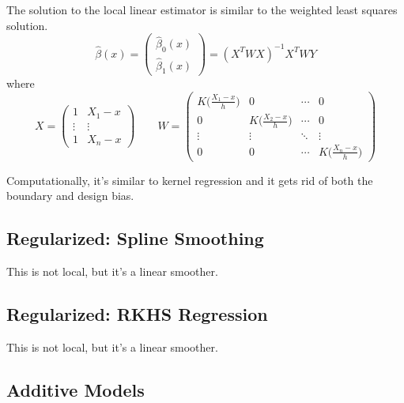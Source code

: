     \begin{theorem}
      The solution to the local linear estimator is similar to the weighted least squares solution. 
      \begin{equation}
        \hat{\beta}(x) = \begin{pmatrix} \hat{\beta}_0 (x) \\ \hat{\beta}_1 (x) \end{pmatrix} = (X^T W X)^{-1} X^T W Y
      \end{equation}
      where 
      \begin{equation}
        X = \begin{pmatrix} 1 & X_1 - x \\ \vdots & \vdots \\ 1 & X_n - x \end{pmatrix} \qquad W = \begin{pmatrix} K \bigg( \frac{X_1 - x}{h} \bigg) & 0 & \cdots & 0 \\ 0 & K \bigg( \frac{X_2 - x}{h} \bigg) & \cdots & 0 \\ \vdots & \vdots & \ddots & \vdots \\ 0 & 0 & \cdots & K \bigg( \frac{X_n - x}{h} \bigg) \end{pmatrix}
      \end{equation}
    \end{theorem}

    Computationally, it's similar to kernel regression and it gets rid of both the boundary and design bias. 

  \subsection{Regularized: Spline Smoothing}

    This is not local, but it's a linear smoother. 

  \subsection{Regularized: RKHS Regression}

    This is not local, but it's a linear smoother. 

  \subsection{Additive Models}

